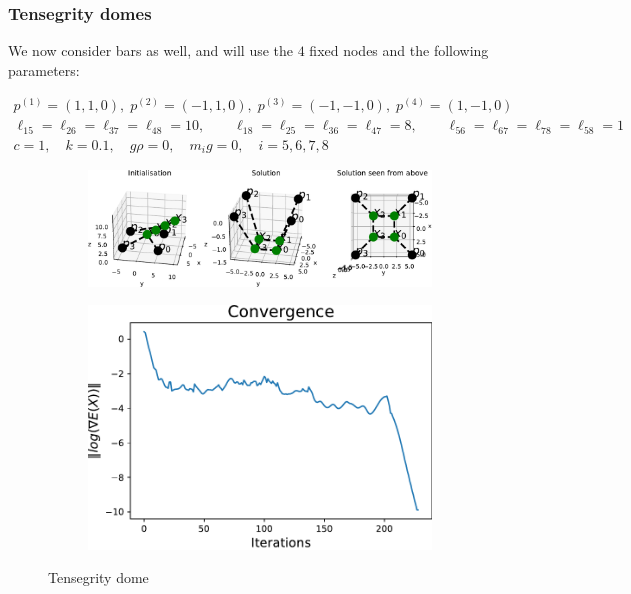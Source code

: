 \subsubsection{Tensegrity domes}
We now consider bars as well, and will use the $4$ fixed nodes and the following parameters:

\begin{equation*}
    \begin{gathered}
    p^{(1)} = (1,1,0),\; p^{(2)} = (-1,1,0),\; p^{(3)} = (-1,-1,0),\; p^{(4)} = (1,-1,0)\\
    \ell_{15} = \ell_{26} = \ell_{37} = \ell_{48} = 10, \qquad \ell_{18} = \ell_{25} = \ell_{36} = \ell_{47} = 8, \qquad \ell_{56} = \ell_{67} = \ell_{78} = \ell_{58} = 1\\
    c=1, \quad k= 0.1, \quad g \rho = 0,\quad m_i g = 0, \quad i = 5,6,7,8
    \end{gathered}
\end{equation*}


\begin{figure}[!ht]
\centering
\begin{subfigure}{.72\textwidth}
  \centering
  \includegraphics[width=0.99\linewidth]{Bilder/P25.pdf}
\end{subfigure}%
\begin{subfigure}{.3\textwidth}
  \centering
  \includegraphics[width=0.99\linewidth]{Bilder/P69conv.pdf}
  \label{fig:sub2}
\end{subfigure}
\caption{Tensegrity dome}
\label{P69}
\end{figure}





